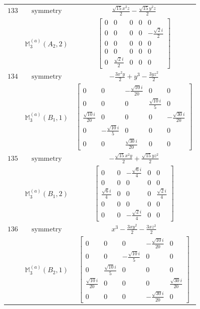 \documentclass[fleqn,8pt,landscape]{jsarticle}
\begin{document}
\begin{longtable}{ccc}
$ 133 $ & $ \text{symmetry} $ & $ \frac{\sqrt{15} x^{2} z}{2} - \frac{\sqrt{15} y^{2} z}{2} $ \\
$  $ & $ \mathbb{M}_{3}^{(a)}(A_{2},2) $ & $ \begin{bmatrix} 0 & 0 & 0 & 0 & 0 \\ 0 & 0 & 0 & 0 & - \frac{\sqrt{2} i}{2} \\ 0 & 0 & 0 & 0 & 0 \\ 0 & 0 & 0 & 0 & 0 \\ 0 & \frac{\sqrt{2} i}{2} & 0 & 0 & 0 \end{bmatrix} $ \\ \hline
$ 134 $ & $ \text{symmetry} $ & $ - \frac{3 x^{2} y}{2} + y^{3} - \frac{3 y z^{2}}{2} $ \\
$  $ & $ \mathbb{M}_{3}^{(a)}(B_{1},1) $ & $ \begin{bmatrix} 0 & 0 & - \frac{\sqrt{10} i}{20} & 0 & 0 \\ 0 & 0 & 0 & \frac{\sqrt{10} i}{5} & 0 \\ \frac{\sqrt{10} i}{20} & 0 & 0 & 0 & - \frac{\sqrt{30} i}{20} \\ 0 & - \frac{\sqrt{10} i}{5} & 0 & 0 & 0 \\ 0 & 0 & \frac{\sqrt{30} i}{20} & 0 & 0 \end{bmatrix} $ \\ \hline
$ 135 $ & $ \text{symmetry} $ & $ - \frac{\sqrt{15} x^{2} y}{2} + \frac{\sqrt{15} y z^{2}}{2} $ \\
$  $ & $ \mathbb{M}_{3}^{(a)}(B_{1},2) $ & $ \begin{bmatrix} 0 & 0 & - \frac{\sqrt{6} i}{4} & 0 & 0 \\ 0 & 0 & 0 & 0 & 0 \\ \frac{\sqrt{6} i}{4} & 0 & 0 & 0 & \frac{\sqrt{2} i}{4} \\ 0 & 0 & 0 & 0 & 0 \\ 0 & 0 & - \frac{\sqrt{2} i}{4} & 0 & 0 \end{bmatrix} $ \\ \hline
$ 136 $ & $ \text{symmetry} $ & $ x^{3} - \frac{3 x y^{2}}{2} - \frac{3 x z^{2}}{2} $ \\
$  $ & $ \mathbb{M}_{3}^{(a)}(B_{2},1) $ & $ \begin{bmatrix} 0 & 0 & 0 & - \frac{\sqrt{10} i}{20} & 0 \\ 0 & 0 & - \frac{\sqrt{10} i}{5} & 0 & 0 \\ 0 & \frac{\sqrt{10} i}{5} & 0 & 0 & 0 \\ \frac{\sqrt{10} i}{20} & 0 & 0 & 0 & \frac{\sqrt{30} i}{20} \\ 0 & 0 & 0 & - \frac{\sqrt{30} i}{20} & 0 \end{bmatrix} $ \\ \hline

\end{longtable}
\end{document}
